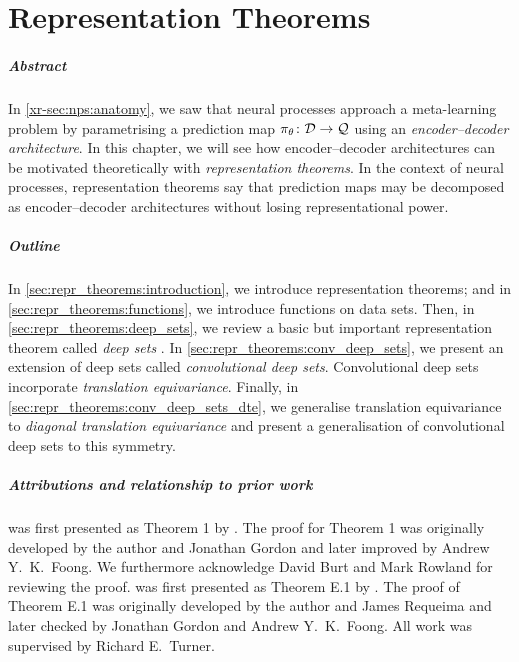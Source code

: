 \documentclass[12pt, twoside]{report}
\newcommand{\xrprefix}[1]{xr-#1}
\begin{document}
\chapter{Representation Theorems}
\label{chap:repr_theorems}

\paragraph{Abstract}
In \cref{\xrprefix{sec:nps:anatomy}}, we saw that neural processes approach a meta-learning problem by parametrising a prediction map $\pi_\theta \colon \mathcal{D} \to \mathcal{Q}$ using an \emph{encoder--decoder architecture}.
In this chapter, we will see how encoder--decoder architectures can be motivated theoretically with \emph{representation theorems}.
In the context of neural processes, representation theorems say that prediction maps may be decomposed as encoder--decoder architectures without losing representational power.

\paragraph{Outline}
In \cref{sec:repr_theorems:introduction}, we introduce representation theorems;
and in \cref{sec:repr_theorems:functions}, we introduce functions on data sets.
Then, in \cref{sec:repr_theorems:deep_sets}, we review a basic but important representation theorem called
\emph{deep sets} \parencite{Zaheer:2017:Deep_Sets,Edwards:2017:Towards_a_Neural_Statistician,Wagstaff:2019:On_the_Limitations_of_Representing}.
In \cref{sec:repr_theorems:conv_deep_sets}, we present an extension of deep sets called \emph{convolutional deep sets}.
Convolutional deep sets incorporate \emph{translation equivariance}.
Finally, in \cref{sec:repr_theorems:conv_deep_sets_dte}, we generalise translation equivariance to \emph{diagonal translation equivariance} and present a generalisation of convolutional deep sets to this symmetry.

\paragraph{Attributions and relationship to prior work}
 was first presented as Theorem 1 by .
The proof for Theorem 1 was originally developed by the author and Jonathan Gordon and later improved by Andrew Y.\ K.\ Foong.
We furthermore acknowledge David Burt and Mark Rowland for reviewing the proof.
 was first presented as Theorem E.1 by .
The proof of Theorem E.1 was originally developed by the author and James Requeima and later checked by Jonathan Gordon and Andrew Y.\ K.\ Foong.
All work was supervised by Richard E.\ Turner.
\end{document}
